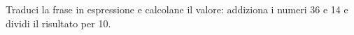 \item Traduci la frase in espressione e calcolane il valore: addiziona i numeri 36 e 14 e dividi il risultato per 10.